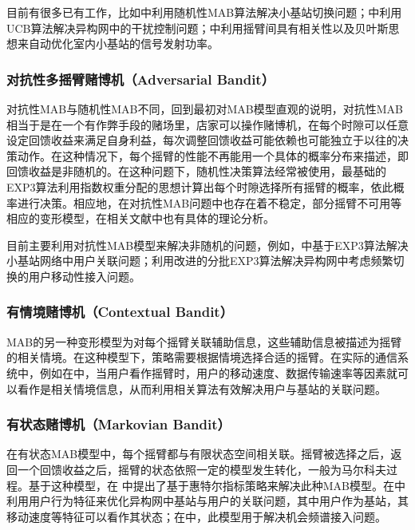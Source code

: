 \documentclass{IEEEtran}
\begin{document}
目前有很多已有工作，比如\cite{Shen2017}中利用随机性MAB算法解决小基站切换问题；\cite{Simsek2015a}中利用UCB算法解决异构网中的干扰控制问题；\cite{Wang2017}中利用摇臂间具有相关性以及贝叶斯思想来自动优化室内小基站的信号发射功率。

\subsubsection{对抗性多摇臂赌博机（Adversarial Bandit）}
对抗性MAB与随机性MAB不同，回到最初对MAB模型直观的说明，对抗性MAB相当于是在一个有作弊手段的赌场里，店家可以操作赌博机，在每个时隙可以任意设定回馈收益来满足自身利益，每次调整回馈收益可能依赖也可能独立于以往的决策动作。在这种情况下，每个摇臂的性能不再能用一个具体的概率分布来描述，即回馈收益是非随机的。在这种问题下，随机性决策算法经常被使用，最基础的EXP3算法\cite{Auer2002}利用指数权重分配的思想计算出每个时隙选择所有摇臂的概率，依此概率进行决策。相应地，在对抗性MAB问题中也存在着不稳定，部分摇臂不可用等相应的变形模型，在相关文献中也有具体的理论分析。

目前主要利用对抗性MAB模型来解决非随机的问题，例如，\cite{Maghsudi2017}中基于EXP3算法解决小基站网络中用户关联问题；\cite{Shen2016}利用改进的分批EXP3算法解决异构网中考虑频繁切换的用户移动性接入问题。

\subsubsection{有情境赌博机（Contextual Bandit）}
MAB的另一种变形模型为对每个摇臂关联辅助信息，这些辅助信息被描述为摇臂的相关情境。在这种模型下，策略需要根据情境选择合适的摇臂。在实际的通信系统中，例如在\cite{Simsek2015a}中，当用户看作摇臂时，用户的移动速度、数据传输速率等因素就可以看作是相关情境信息，从而利用相关算法有效解决用户与基站的关联问题。



\subsubsection{有状态赌博机（Markovian Bandit）}
在有状态MAB模型中，每个摇臂都与有限状态空间相关联。摇臂被选择之后，返回一个回馈收益之后，摇臂的状态依照一定的模型发生转化，一般为马尔科夫过程。基于这种模型，在 中提出了基于惠特尔指标策略来解决此种MAB模型。在\cite{Sun2017}中利用用户行为特征来优化异构网中基站与用户的关联问题，其中用户作为基站，其移动速度等特征可以看作其状态；在\cite{Tekin2011}中，此模型用于解决机会频谱接入问题。

\end{document}
